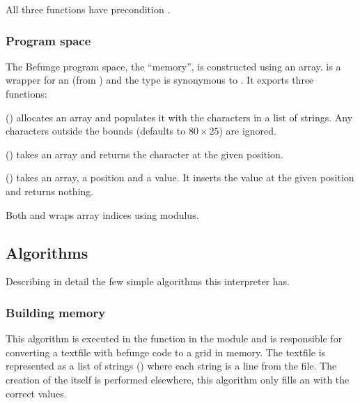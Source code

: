 \documentclass[12pt, a4paper]{article}
\begin{document}
\vspace{6pt}
\noindent
All three functions have precondition .

\subsubsection{Program space}
\label{sec:structmem}

The Befunge program space, the “memory”, is constructed using an array.  is a wrapper for an  (from ) and the type  is synonymous to . It exports three functions:

\vspace{6pt}
\noindent
{} () allocates an array and populates it with the characters in a list of strings. Any characters outside the bounds (defaults to $80 \times 25$) are ignored.

\vspace{6pt}
\noindent
{} () takes an array and returns the character at the given position.

\vspace{6pt}
\noindent
{} () takes an array, a position and a value. It inserts the value at the given position and returns nothing.

\vspace{6pt}
\noindent
Both  and  wraps array indices using modulus.

\subsection{Algorithms}
\label{sec:algorithms}

Describing in detail the few simple algorithms this interpreter has.

\subsubsection{Building memory}
\label{sec:buildMemory}

This algorithm is executed in the function  in the module  and is responsible for converting a textfile with befunge code to a grid in memory. The textfile is represented as a list of strings (\code{[String]}) where each string is a line from the file. The creation of the  itself is performed elsewhere, this algorithm only fills an  with the correct values.
\end{document}
